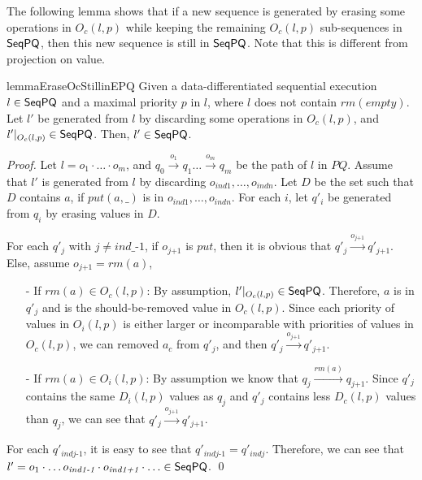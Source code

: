 The following lemma shows that if a new sequence is generated by erasing some operations in $O_c(l,p)$ while keeping the remaining $O_c(l,p)$ sub-sequences in $\mathsf{SeqPQ}$, then this new sequence is still in $\mathsf{SeqPQ}$. Note that this is different from projection on value.

\begin{restatable}{lemma}{EraseOcStillinEPQ}
\label{lemma:erase Oc still in EPQ}
Given a data-differentiated sequential execution $l \in \mathsf{SeqPQ}$ and a maximal priority $p$ in $l$, where $l$ does not contain $\textit{rm}(\textit{empty})$. Let $l'$ be generated from $l$ by discarding some operations in $O_c(l,p)$, and $l' \vert_{ O_c(l,p) } \in \mathsf{SeqPQ}$. Then, $l' \in \mathsf{SeqPQ}$.
\end{restatable}

\begin {proof}
Let $l=o_1 \cdot \ldots \cdot o_m$, and $q_0 \xrightarrow{o_1} q_1 \ldots \xrightarrow{o_m} q_m$ be the path of $l$ in $\textit{PQ}$. Assume that $l'$ is generated from $l$ by discarding $o_{\textit{ind1}},\ldots,o_{\textit{indn}}$. Let $D$ be the set such that $D$ contains $a$, if $\textit{put}(a,\_)$ is in $o_{\textit{ind1}},\ldots,o_{\textit{indn}}$. For each $i$, let $q'_i$ be generated from $q_i$ by erasing values in $D$.

For each $q'_j$ with $j \neq \textit{ind}\_\textit{-1}$, if $o_{\textit{j+1}}$ is $\textit{put}$, then it is obvious that $q'_j \xrightarrow{o_{\textit{j+1}}} q'_{\textit{j+1}}$. Else, assume $o_{\textit{j+1}} = \textit{rm}(a)$,

\begin{itemize}
\setlength{\itemsep}{0.5pt}
\item[-] If $\textit{rm}(a) \in O_c(l,p)$: By assumption, $l' \vert_{ O_c(l,p) } \in \mathsf{SeqPQ}$. Therefore, $a$ is in $q'_j$ and is the should-be-removed value in $O_c(l,p)$. Since each priority of values in $O_i(l,p)$ is either larger or incomparable with priorities of values in $O_c(l,p)$, we can removed $a_c$ from $q'_j$, and then $q'_j \xrightarrow{o_{\textit{j+1}}} q'_{\textit{j+1}}$.

\item[-] If $\textit{rm}(a) \in O_i(l,p)$: By assumption we know that $q_j \xrightarrow{\textit{rm}(a)} q_{\textit{j+1}}$. Since $q'_j$ contains the same $D_i(l,p)$ values as $q_j$ and $q'_j$ contains less $D_c(l,p)$ values than $q_j$, we can see that $q'_j \xrightarrow{o_{\textit{j+1}}} q'_{\textit{j+1}}$.
\end{itemize}

For each $q'_{\textit{indj-1}}$, it is easy to see that $q'_{\textit{indj-1}} = q'_{\textit{indj}}$. Therefore, we can see that $l' = o_1 \cdot \ldots o_{\textit{ind1-1}} \cdot o_{\textit{ind1+1}} \cdot \ldots \in \mathsf{SeqPQ}$. \qed
\end {proof}


